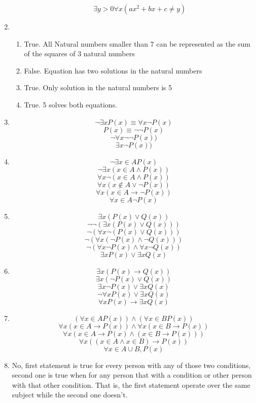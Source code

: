 \begin{enumerate}
\begin{enumerate}
        \[\exists y > 0 \forall x (ax^2 +bx +c \neq y)\]
    \end{enumerate}
    \item 
    \begin{enumerate}
        \item True. All Natural numbers smaller than 7 can be represented as the sum of the squares of 3 natural numbers
        \item False. Equation has two solutions in the natural numbers
        \item True. Only solution in the natural numbers is 5
        \item True. 5 solves both equations.
    \end{enumerate}
    \item 
    \[\lnot \exists x P(x) \equiv \forall x \lnot P(x)\]
    \[P(x) \equiv \lnot \lnot P(x)\]
    \[\lnot \forall x \lnot \lnot P(x))\]
    \[\exists x \lnot P(x))\]
    \item
    \[\lnot \exists x \in A P(x)\]
    \[\lnot \exists x (x \in A \land P(x))\]
    \[\forall x \lnot (x \in A \land P(x))\]
    \[\forall x (x \notin A \lor \lnot P(x))\]
    \[\forall x (x \in A \rightarrow \lnot P(x))\]
    \[\forall x \in A \lnot P(x)\]
    \item
    \[\exists x (P(x) \lor Q(x))\]
    \[\lnot \lnot (\exists x (P(x) \lor Q(x)))\]
    \[\lnot (\forall x \lnot (P(x) \lor Q(x)))\]
    \[\lnot (\forall x (\lnot P(x) \land \lnot Q(x)))\]
    \[\lnot (\forall x \lnot P(x) \land \forall x \lnot Q(x))\]
    \[\exists x P(x) \lor \exists x Q(x)\]
    \item
    \[\exists x (P(x) \rightarrow Q(x))\]
    \[\exists x (\lnot P(x) \lor Q(x))\]
    \[\exists x \lnot P(x) \lor \exists x Q(x)\]
    \[\lnot \forall x P(x) \lor \exists x Q(x)\]
    \[\forall x P(x) \rightarrow \exists x Q(x)\]
    \item
    \[(\forall x \in A P(x)) \land (\forall x \in B P(x))\]
    \[\forall x (x \in A \rightarrow P(x)) \land \forall x (x \in B \rightarrow P(x))\]
    \[\forall x (x\in A \rightarrow P(x) \land (x \in B \rightarrow P(x)))\]
    \[\forall x ((x \in A \land x \in B) \rightarrow P(x))\]
    \[\forall x \in A \cup B, P(x)\]
    \item
    No, first statement is true for every person with any of those two conditions, second one is true when for any person that with a condition or other person with that other condition.
    That is, the first statement operate over the same subject while the second one doesn't.

\end{enumerate}
